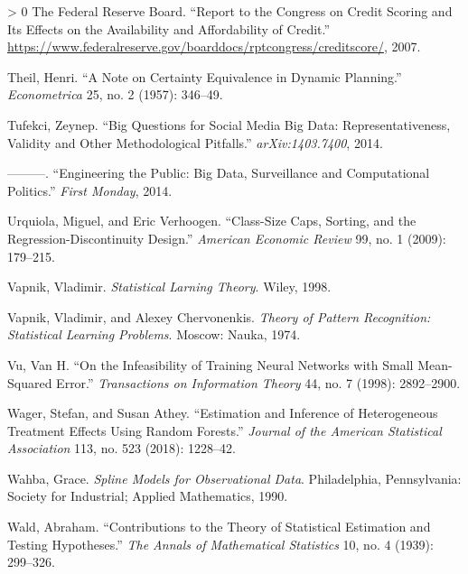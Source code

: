 \documentclass{tufte-book}
\newlength{\cslhangindent}
\newenvironment{CSLReferences}[3] %
 {%
  \setlength{\parindent}{0pt}
  \ifodd #1 \everypar{\setlength{\hangindent}{\cslhangindent}}\ignorespaces\fi
  \ifnum #2 > 0
  \setlength{\parskip}{#3\baselineskip}
  \fi
 }%
 {
 }
\begin{document}
\begin{CSLReferences}{1}{0}
\leavevmode\hypertarget{ref-federalreserve2007report}{}%
The Federal Reserve Board. {``Report to the Congress on Credit Scoring
and Its Effects on the Availability and Affordability of Credit.''}
\url{https://www.federalreserve.gov/boarddocs/rptcongress/creditscore/},
2007.

\leavevmode\hypertarget{ref-Theil57}{}%
Theil, Henri. {``A Note on Certainty Equivalence in Dynamic Planning.''}
\emph{Econometrica} 25, no. 2 (1957): 346--49.

\leavevmode\hypertarget{ref-tufekci2014big}{}%
Tufekci, Zeynep. {``Big Questions for Social Media Big Data:
Representativeness, Validity and Other Methodological Pitfalls.''}
\emph{arXiv:1403.7400}, 2014.

\leavevmode\hypertarget{ref-tufekci2014engineering}{}%
---------. {``Engineering the Public: Big Data, Surveillance and
Computational Politics.''} \emph{First Monday}, 2014.

\leavevmode\hypertarget{ref-urquiola2009class}{}%
Urquiola, Miguel, and Eric Verhoogen. {``Class-Size Caps, Sorting, and
the Regression-Discontinuity Design.''} \emph{American Economic Review}
99, no. 1 (2009): 179--215.

\leavevmode\hypertarget{ref-vapnik1998SLTBook}{}%
Vapnik, Vladimir. \emph{Statistical Larning Theory}. Wiley, 1998.

\leavevmode\hypertarget{ref-VapnikChervonenkis1974Book}{}%
Vapnik, Vladimir, and Alexey Chervonenkis. \emph{Theory of Pattern
Recognition: Statistical Learning Problems}. Moscow: Nauka, 1974.

\leavevmode\hypertarget{ref-vu1998infeasibility}{}%
Vu, Van H. {``On the Infeasibility of Training Neural Networks with
Small Mean-Squared Error.''} \emph{Transactions on Information Theory}
44, no. 7 (1998): 2892--2900.

\leavevmode\hypertarget{ref-wager-causal-forests}{}%
Wager, Stefan, and Susan Athey. {``Estimation and Inference of
Heterogeneous Treatment Effects Using Random Forests.''} \emph{Journal
of the American Statistical Association} 113, no. 523 (2018): 1228--42.

\leavevmode\hypertarget{ref-Wahba90}{}%
Wahba, Grace. \emph{Spline Models for Observational Data}. Philadelphia,
Pennsylvania: Society for Industrial; Applied Mathematics, 1990.

\leavevmode\hypertarget{ref-wald1939}{}%
Wald, Abraham. {``Contributions to the Theory of Statistical Estimation
and Testing Hypotheses.''} \emph{The Annals of Mathematical Statistics}
10, no. 4 (1939): 299--326.


\end{CSLReferences}
\end{document}
